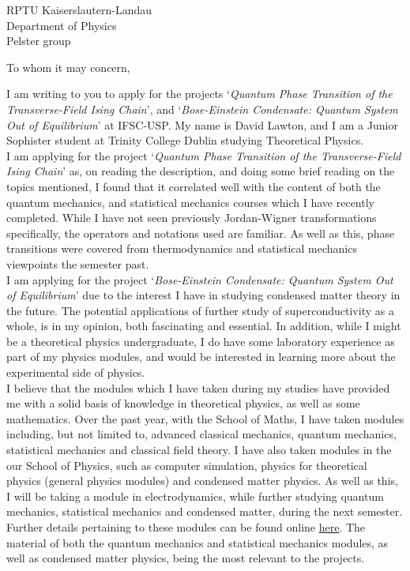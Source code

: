 \documentclass{letter}
\begin{document}
\begin{letter}{RPTU Kaiserslautern-Landau\\
    Department of Physics\\
    Pelster group\\}

\opening{To whom it may concern,}
I am writing to you to apply for the projects `\textit{Quantum Phase Transition of the Transverse-Field Ising Chain}', and `\textit{Bose-Einstein Condensate: Quantum System Out of Equilibrium}' at IFSC-USP. My name is David Lawton, and I am a Junior Sophister student at Trinity College Dublin studying Theoretical Physics.\\

I am applying for the project `\textit{Quantum Phase Transition of the Transverse-Field Ising Chain}' as, on reading the description, and doing some brief reading on the topics mentioned, I found that it correlated well with the content of both the quantum mechanics, and statistical mechanics courses which I have recently completed. While I have not seen previously Jordan-Wigner transformations specifically, the operators and notations used are familiar. As well as this, phase transitions were covered from thermodynamics and statistical mechanics viewpoints the semester past.\\

I am applying for the project `\textit{Bose-Einstein Condensate: Quantum System Out of Equilibrium}' due to the interest I have in studying condensed matter theory in the future. The potential applications of further study of superconductivity as a whole, is in my opinion, both fascinating and essential. In addition, while I might be a theoretical physics undergraduate, I do have some laboratory experience as part of my physics modules, and would be interested in learning more about the experimental side of physics.\\

I believe that the modules which I have taken during my studies have provided me with a solid basis of knowledge in theoretical physics, as well as some mathematics. Over the past year, with the School of Maths, I have taken modules including, but not limited to, advanced classical mechanics, quantum mechanics, statistical mechanics and classical field theory. I have also taken modules in the our School of Physics, such as computer simulation, physics for theoretical physics (general physics modules) and condensed matter physics. As well as this, I will be taking a module in electrodynamics, while further studying quantum mechanics, statistical mechanics and condensed matter, during the next semester. Further details pertaining to these modules can be found online \href{https://www.maths.tcd.ie/undergraduate/modules/jstp.php}{here}. The material of both the quantum mechanics and statistical mechanics modules, as well as condensed matter physics, being the most relevant to the projects.\\


\end{letter}
\end{document}
